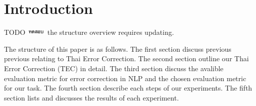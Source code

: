 \section{Introduction}

TODO \includegraphics[height=0.85em, trim=0.5em 0.45em 0.5em 0em]{thai-text/test-2.pdf} the structure overview requires updating.

The structure of this paper is as follows. The first section discuss previous previous relating to Thai Error Correction. The second section outline our Thai Error Correction (TEC) in detail. The third section discuss the avalible evaluation metric for error correction in NLP and the chosen evaluation metric for our task. The fourth section describe each steps of our experiments. The fifth section lists and discusses the results of each experiment.
